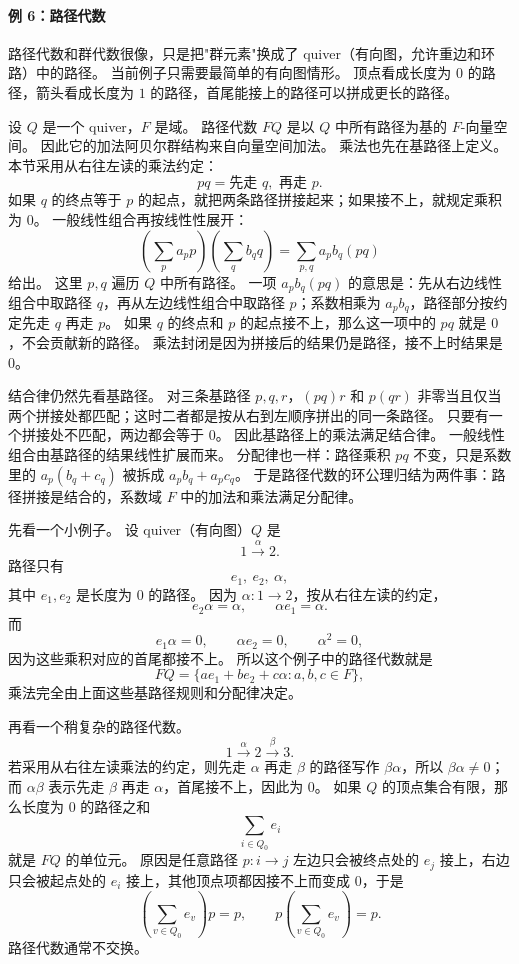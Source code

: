 \paragraph*{例 6：路径代数}
路径代数和群代数很像，只是把"群元素"换成了 quiver（有向图，允许重边和环路）中的路径。
当前例子只需要最简单的有向图情形。
顶点看成长度为 $0$ 的路径，箭头看成长度为 $1$ 的路径，首尾能接上的路径可以拼成更长的路径。

设 $Q$ 是一个 quiver，$F$ 是域。
路径代数 $FQ$ 是以 $Q$ 中所有路径为基的 $F$-向量空间。
因此它的加法阿贝尔群结构来自向量空间加法。
乘法也先在基路径上定义。
本节采用从右往左读的乘法约定：
\[
pq=\text{先走 }q,\text{ 再走 }p.
\]
如果 $q$ 的终点等于 $p$ 的起点，就把两条路径拼接起来；如果接不上，就规定乘积为 $0$。
一般线性组合再按线性性展开：
\[
\left(\sum_p a_p p\right)\left(\sum_q b_q q\right)=\sum_{p,q}a_pb_q(pq)
\]
给出。
这里 $p,q$ 遍历 $Q$ 中所有路径。
一项 $a_pb_q(pq)$ 的意思是：先从右边线性组合中取路径 $q$，再从左边线性组合中取路径 $p$；系数相乘为 $a_pb_q$，路径部分按约定先走 $q$ 再走 $p$。
如果 $q$ 的终点和 $p$ 的起点接不上，那么这一项中的 $pq$ 就是 $0$，不会贡献新的路径。
乘法封闭是因为拼接后的结果仍是路径，接不上时结果是 $0$。

结合律仍然先看基路径。
对三条基路径 $p,q,r$，$(pq)r$ 和 $p(qr)$ 非零当且仅当两个拼接处都匹配；这时二者都是按从右到左顺序拼出的同一条路径。
只要有一个拼接处不匹配，两边都会等于 $0$。
因此基路径上的乘法满足结合律。
一般线性组合由基路径的结果线性扩展而来。
分配律也一样：路径乘积 $pq$ 不变，只是系数里的 $a_p(b_q+c_q)$ 被拆成 $a_pb_q+a_pc_q$。
于是路径代数的环公理归结为两件事：路径拼接是结合的，系数域 $F$ 中的加法和乘法满足分配律。

先看一个小例子。
设 quiver（有向图）$Q$ 是
\[
1\xrightarrow{\alpha}2.
\]
路径只有
\[
e_1,\ e_2,\ \alpha,
\]
其中 $e_1,e_2$ 是长度为 $0$ 的路径。
因为 $\alpha:1\to2$，按从右往左读的约定，
\[
e_2\alpha=\alpha,\qquad \alpha e_1=\alpha.
\]
而
\[
e_1\alpha=0,\qquad \alpha e_2=0,\qquad \alpha^2=0,
\]
因为这些乘积对应的首尾都接不上。
所以这个例子中的路径代数就是
\[
FQ=\{ae_1+be_2+c\alpha:a,b,c\in F\},
\]
乘法完全由上面这些基路径规则和分配律决定。

再看一个稍复杂的路径代数。
\[
1\xrightarrow{\alpha}2\xrightarrow{\beta}3.
\]
若采用从右往左读乘法的约定，则先走 $\alpha$ 再走 $\beta$ 的路径写作 $\beta\alpha$，所以 $\beta\alpha\neq0$；而 $\alpha\beta$ 表示先走 $\beta$ 再走 $\alpha$，首尾接不上，因此为 $0$。
如果 $Q$ 的顶点集合有限，那么长度为 $0$ 的路径之和
\[
\sum_{i\in Q_0}e_i
\]
就是 $FQ$ 的单位元。
原因是任意路径 $p:i\to j$ 左边只会被终点处的 $e_j$ 接上，右边只会被起点处的 $e_i$ 接上，其他顶点项都因接不上而变成 $0$，于是
\[
\left(\sum_{v\in Q_0}e_v\right)p=p,\qquad
p\left(\sum_{v\in Q_0}e_v\right)=p.
\]
路径代数通常不交换。

